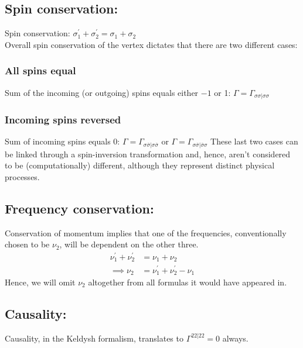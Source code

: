 \documentclass[12pt,a4paper,roman]{article}
\begin{document}
\subsection*{Spin conservation:}
Spin conservation: $\sigma_{1}^\prime + \sigma_{2}^\prime = \sigma_1 + \sigma_2$
\\
Overall spin conservation of the vertex dictates that there are two different cases:
\subsubsection*{All spins equal}
Sum of the incoming (or outgoing) spins equals either $-1$ or 1: 
$\Gamma = \Gamma_{\sigma\sigma|\sigma\sigma}$
\subsubsection*{Incoming spins reversed}
Sum of incoming spins equals 0: 
$\Gamma = \Gamma_{\sigma\overline{\sigma}|\sigma\overline{\sigma}}$ or $\Gamma = \Gamma_{\sigma\overline{\sigma}|\overline{\sigma}\sigma}$
These last two cases can be linked through a spin-inversion transformation and, hence, aren't considered to be (computationally) different, although they represent distinct physical processes.

\subsection*{Frequency conservation:}
Conservation of momentum implies that one of the frequencies, conventionally chosen to be $\nu_2$, will be dependent on the other three.
\begin{align}
    \nu_{1}^\prime + \nu_{2}^\prime &= \nu_1 + \nu_2  \\
    \implies \nu_2 &= \nu_{1}^\prime + \nu_{2}^\prime -\nu_1
\end{align}
Hence, we will omit $\nu_{2}$ altogether from all formulas it would have appeared in.

\subsection*{Causality:}
Causality, in the Keldysh formalism, translates to $\Gamma^{22|22} = 0$ always.
\end{document}

